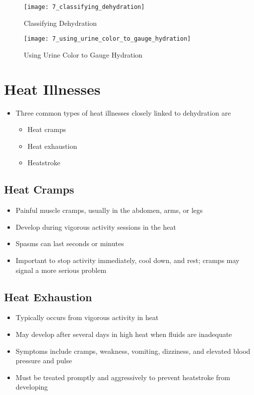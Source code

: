 \documentclass[title={Chapter 7}]{fdsn201notes}
\begin{document}
\begin{figure}[H]
	\centering
	\texttt{[image: 7\_classifying\_dehydration]}
	\caption{Classifying Dehydration}
	\label{fig:7_classifying_dehydration}
\end{figure}

\begin{figure}[H]
	\centering
	\texttt{[image: 7\_using\_urine\_color\_to\_gauge\_hydration]}
	\caption{Using Urine Color to Gauge Hydration}
	\label{fig:using_urine_color_to_gauge_hydration}
\end{figure}

\section{Heat Illnesses}\label{sec:heat-illnesses}
\begin{itemize}
	\item Three common types of heat illnesses closely linked to dehydration are
	\begin{itemize}
		\item Heat cramps
		\item Heat exhaustion
		\item Heatstroke
	\end{itemize}
\end{itemize}

\subsection{Heat Cramps}\label{subsec:heat-cramps}
\begin{itemize}
	\item Painful muscle cramps, usually in the abdomen, arms, or legs
	\item Develop during vigorous activity sessions in the heat
	\item Spasms can last seconds or minutes
	\item Important to stop activity immediately, cool down, and rest; cramps may signal a more serious problem
\end{itemize}

\subsection{Heat Exhaustion}\label{subsec:heat-exhaustion}
\begin{itemize}
	\item Typically occurs from vigorous activity in heat
	\item May develop after several days in high heat when fluids are inadequate
	\item Symptoms include cramps, weakness, vomiting, dizziness, and elevated blood pressure and pulse
	\item Must be treated promptly and aggressively to prevent heatstroke from developing
\end{itemize}
\end{document}
